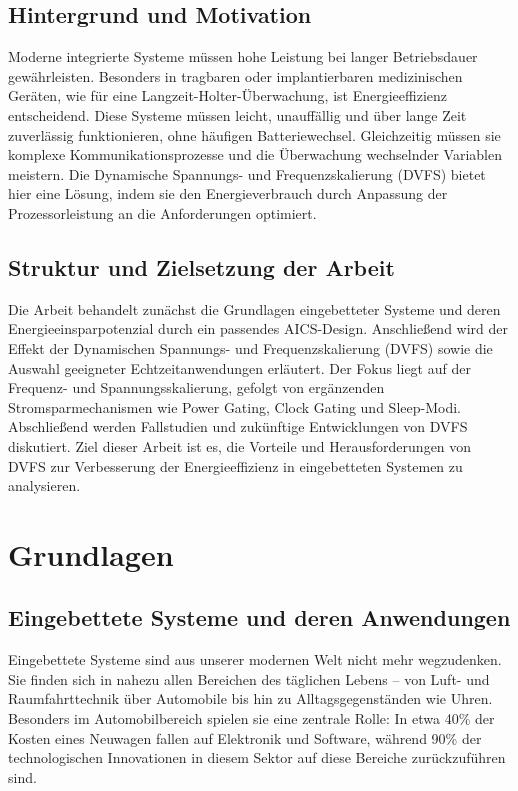 \documentclass[footmark=none]{tubaf-thesis}
\begin{document}
    	\section{Hintergrund und Motivation}
   			Moderne integrierte Systeme müssen hohe Leistung bei langer Betriebsdauer gewährleisten. Besonders in tragbaren oder implantierbaren medizinischen Geräten, wie für eine Langzeit-Holter-Überwachung, ist Energieeffizienz entscheidend. Diese Systeme müssen leicht, unauffällig und über lange Zeit zuverlässig funktionieren, ohne häufigen Batteriewechsel. Gleichzeitig müssen sie komplexe Kommunikationsprozesse und die Überwachung wechselnder Variablen meistern. Die Dynamische Spannungs- und Frequenzskalierung (DVFS) bietet hier eine Lösung, indem sie den Energieverbrauch durch Anpassung der Prozessorleistung an die Anforderungen optimiert. \cite{5256133}
    	\section{Struktur und Zielsetzung der Arbeit}
    		Die Arbeit behandelt zunächst die Grundlagen eingebetteter Systeme und deren Energieeinsparpotenzial durch ein passendes AICS-Design. Anschließend wird der Effekt der Dynamischen Spannungs- und Frequenzskalierung (DVFS) sowie die Auswahl geeigneter Echtzeitanwendungen erläutert. Der Fokus liegt auf der Frequenz- und Spannungsskalierung, gefolgt von ergänzenden Stromsparmechanismen wie Power Gating, Clock Gating und Sleep-Modi. Abschließend werden Fallstudien und zukünftige Entwicklungen von DVFS diskutiert.
    		 Ziel dieser Arbeit ist es, die Vorteile und Herausforderungen von DVFS zur Verbesserung der Energieeffizienz in eingebetteten Systemen zu analysieren.
    
    \chapter{Grundlagen}
    	\section{Eingebettete Systeme und deren Anwendungen}
    		Eingebettete Systeme sind aus unserer modernen Welt nicht mehr wegzudenken. Sie finden sich in nahezu allen Bereichen des täglichen Lebens – von Luft- und Raumfahrttechnik über Automobile bis hin zu Alltagsgegenständen wie Uhren. Besonders im Automobilbereich spielen sie eine zentrale Rolle: In etwa 40\% der Kosten eines Neuwagen fallen auf Elektronik und Software, während 90\% der technologischen Innovationen in diesem Sektor auf diese Bereiche zurückzuführen sind. \cite{berns2010eingebettete}
    		
\end{document}
